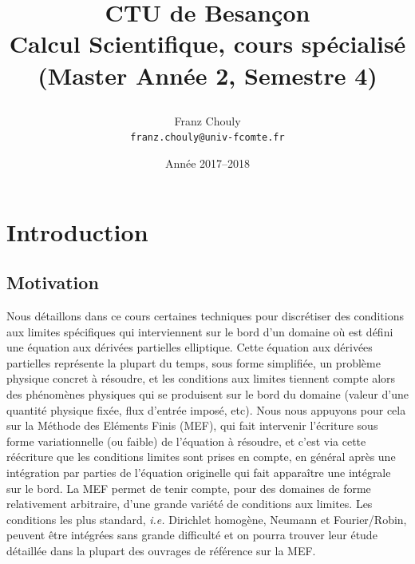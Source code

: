 \documentclass[11pt]{book}
\title{{
\begin{minipage}{\textwidth}\begin{flushleft} \large CTU de Besan{\c c}on
 \\ { %
 Calcul Scientifique, cours sp{\'e}cialis{\'e} (Master Ann\'ee 2, Semestre 4)}
\end{flushleft}\end{minipage}} \vskip2cm
\bf \sc \huge  \ovalbox{\begin{minipage}{\textwidth} \centering
 Sur la prise en compte de quelques conditions aux limites avec la 
 méthode des éléments finis
 \end{minipage}
}
}
\date{Ann{\'e}e 2017--2018}
\author{Franz Chouly \\ {\tt \small franz.chouly@univ-fcomte.fr}}
\begin{document}

\maketitle

\tableofcontents

\chapter{Introduction}


\section{Motivation}

Nous détaillons dans ce cours certaines techniques pour discrétiser des conditions aux limites spécifiques qui interviennent sur le bord d'un domaine où est défini une équation aux dérivées partielles elliptique. Cette équation aux dérivées partielles représente la plupart du temps, sous forme simplifiée, un problème physique concret à résoudre, et les conditions aux limites tiennent compte alors des phénomènes physiques qui se produisent sur le bord du domaine (valeur d'une quantité physique fixée, flux d'entrée imposé, etc). Nous nous appuyons pour cela sur la Méthode des Eléments Finis (MEF), qui fait intervenir l'écriture sous forme variationnelle (ou faible) de l'équation à résoudre, et c'est via cette réécriture que les conditions limites sont prises en compte, en général après une intégration par parties de l'équation originelle qui fait apparaître une intégrale sur le bord. La MEF permet de tenir compte, pour des domaines de forme relativement arbitraire, d'une grande variété de conditions aux limites. Les conditions les plus standard, {\it i.e.} Dirichlet homogène, Neumann et Fourier/Robin, peuvent être intégrées sans grande difficulté et on pourra trouver leur étude détaillée dans la plupart des ouvrages de référence sur la MEF. %
\end{document}

